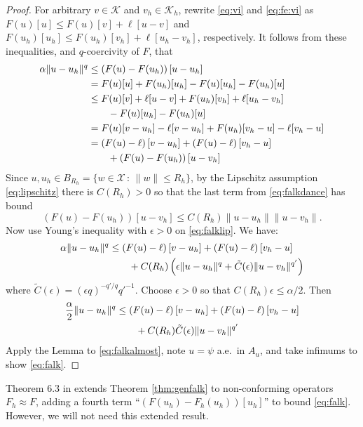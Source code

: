 \documentclass[]{interact}
\theoremstyle{plain}%
\theoremstyle{definition}
\theoremstyle{remark}
\newcommand{\eps}{\epsilon}
\newcommand{\cK}{\mathcal{K}}
\newcommand{\cX}{\mathcal{X}}
\begin{document}
\begin{proof}  For arbitrary $v\in\cK$ and $v_h\in\cK_h$, rewrite \eqref{eq:vi} and \eqref{eq:fe:vi} as $F(u)[u] \le F(u)[v] + \ell[u-v]$ and $F(u_h)[u_h] \le F(u_h)[v_h] + \ell[u_h-v_h]$, respectively.  It follows from these inequalities, and $q$-coercivity of $F$, that
\begin{align}
\alpha \|u-u_h\|^q &\le \left(F(u)-F(u_h)\right)[u-u_h] \label{eq:falkdance} \\
  &= F(u)[u] + F(u_h)[u_h] - F(u)[u_h] - F(u_h)[u] \notag \\
  &\le F(u)[v] + \ell[u-v] + F(u_h)[v_h] + \ell[u_h-v_h] \notag \\
  &\qquad - F(u)[u_h] - F(u_h)[u] \notag \\
  &= F(u)[v-u_h] - \ell[v-u_h] + F(u_h)[v_h-u] - \ell[v_h-u] \notag \\
  &= \left(F(u)-\ell\right)[v-u_h] + \left(F(u)-\ell\right)[v_h-u] \notag \\
  &\qquad + \left(F(u)-F(u_h)\right)[u-v_h] \notag
\end{align}
Since $u,u_h\in B_{R_h} = \{w\in\cX\,:\,\|w\|\le R_h\}$, by the Lipschitz assumption \eqref{eq:lipschitz} there is $C(R_h)>0$ so that the last term from \eqref{eq:falkdance} has bound
\begin{equation}
\left(F(u)-F(u_h)\right)[u-v_h] \le C(R_h) \|u-u_h\|\|u-v_h\|. \label{eq:falklip}
\end{equation}
Now use Young's inequality with $\eps>0$ \cite[Appendix B.2]{Evans2010} on \eqref{eq:falklip}.  We have:
\begin{align}
\alpha \|u-u_h\|^q &\le \left(F(u)-\ell\right)[v-u_h] + \left(F(u)-\ell\right)[v_h-u]  \label{eq:falkyoung} \\
  &\qquad + C(R_h) \left(\eps\|u-u_h\|^q + \tilde C(\eps) \|u-v_h\|^{q'}\right) \notag
\end{align}
where $\tilde C(\eps) = (\eps q)^{-q'/q} {q'}^{-1}$.  Choose $\eps>0$ so that $C(R_h) \eps \le \alpha/2$.  Then
\begin{align}
\frac{\alpha}{2} \|u-u_h\|^q &\le \left(F(u)-\ell\right)[v-u_h] + \left(F(u)-\ell\right)[v_h-u]  \label{eq:falkalmost} \\
  &\qquad + C(R_h) \tilde C(\eps) \|u-v_h\|^{q'} \notag
\end{align}
Apply the Lemma to \eqref{eq:falkalmost}, note $u=\psi$ a.e.~in $A_u$, and take infimums to show \eqref{eq:falk}.\end{proof}

Theorem 6.3 in \cite{Bueler2024} extends Theorem \ref{thm:genfalk} to non-conforming operators $F_h\approx F$, adding a fourth term ``$(F(u_h)-F_h(u_h))[u_h]$'' to bound \eqref{eq:falk}.  However, we will not need this extended result.
\end{document}
